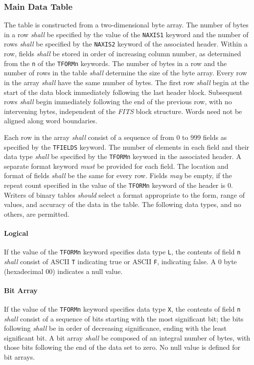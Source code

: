 \documentclass[11pt,makeidx]{book}     %
\begin{document}
   \subsubsection{Main Data Table}
   \label{s:MbinT}
   The table is constructed from a two-dimensional byte array.
   The number of bytes in a row {\em shall} be specified by the value of 
   the {\tt NAXIS1} keyword and the number of rows {\em shall} be 
   specified by the {\tt NAXIS2} keyword
   of the associated header.  Within a row, fields {\em shall}
   be stored in order of increasing column number, as determined from
   the {\tt n} of the {\tt TFORMn} keywords. 
   The number of bytes in a row and the number of rows in the
   table {\em shall} determine the size of the byte array.  Every row
   in the array {\em shall} have the same number of bytes. The
   first row {\em shall} begin at the start of the data block
   immediately following the last header block. Subsequent rows 
   {\em shall} begin immediately following the
   end of the previous row, with no intervening bytes,
   independent of the {\em FITS\/} block structure.  Words need not
   be aligned along word boundaries.  
  
   Each row in the array {\em shall} consist of a sequence of from 0 to 999 fields
   as specified by the {\tt TFIELDS} keyword.
   The number of elements in each field and their data type {\em shall}
   be specified by the {\tt TFORMn} keyword in the associated header.  A
   separate format keyword {\em must} be provided for each field.  The
   location and format of fields {\em shall} be the same for every row.
   Fields {\em may} be empty, if the repeat 
   count specified in the value of the 
   {\tt TFORMn} keyword of the header is 0.  
   Writers of binary tables {\em should} select a format appropriate to the 
   form, range of values, and accuracy of the data in the table.    
   The following 
   data types, and no others, are permitted.

  
   \paragraph{Logical} 
    If the value of 
    the {\tt TFORMn} keyword specifies data type {\tt L}, the contents
    of field {\tt n} {\em shall} consist of ASCII {\tt T} indicating true or  
    ASCII {\tt F}, indicating false.   A 0 byte (hexadecimal 00) indicates 
    a null value.        

   \paragraph{Bit Array} 
    If the value of 
    the {\tt TFORMn} keyword specifies data type {\tt X}, the 
    contents of field {\tt n} {\em shall} consist of a sequence of bits
    starting with the most significant bit; the bits following {\em shall} be
    in order of decreasing significance, ending with the least 
    significant bit. A bit array {\em shall} be composed of
    an integral number of bytes, with those bits following the end of the 
    data set to zero.  No null value is defined for bit arrays.
\end{document}
